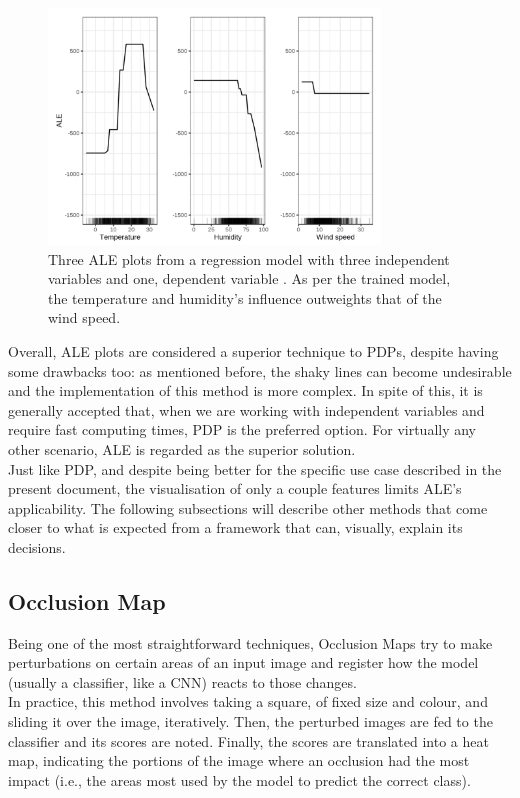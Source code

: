 \begin{figure}[h]
\centering
\includegraphics[width=250pt]{figures/figure_18.pdf}
\caption{Three \ac{ALE} plots from a regression model with three independent variables and one, dependent variable \cite{molnar2019}. As per the trained model, the temperature and humidity's influence outweights that of the wind speed.}
\label{fig:accumulated_local_effects}
\end{figure}

Overall, \ac{ALE} plots are considered a superior technique to \ac{PDP}s, despite having some drawbacks too: as mentioned before, the shaky lines can become undesirable and the implementation of this method is more complex. In spite of this, it is generally accepted that, when we are working with independent variables and require fast computing times, \ac{PDP} is the preferred option. For virtually any other scenario, \ac{ALE} is regarded as the superior solution.\\

Just like \ac{PDP}, and despite being better for the specific use case described in the present document, the visualisation of only a couple features limits \ac{ALE}'s applicability. The following subsections will describe other methods that come closer to what is expected from a framework that can, visually, explain its decisions.

\subsection{Occlusion Map}
\label{subsec:chap2_occlusion_map}
Being one of the most straightforward techniques, Occlusion Maps try to make perturbations on certain areas of  an input image and register how the model (usually a classifier, like a \ac{CNN}) reacts to those changes.\\

In practice, this method involves taking a square, of fixed size and colour, and sliding it over the image, iteratively. Then, the perturbed images are fed to the classifier and its scores are noted. Finally, the scores are translated into a heat map, indicating the portions of the image where an occlusion had the most impact (i.e., the areas most used by the model to predict the correct class).\\

